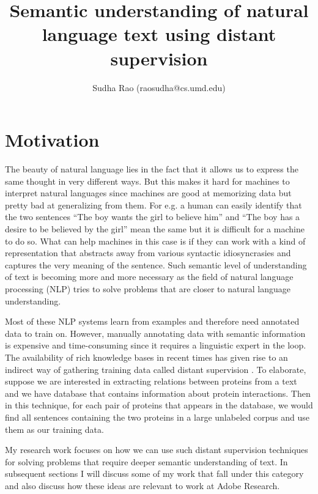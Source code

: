 \documentclass[11pt,a4paper]{article}
\title{Semantic understanding of natural language text using distant supervision}
\author{Sudha Rao (raosudha@cs.umd.edu)}
\begin{document}
\maketitle
\section{Motivation}
The beauty of natural language lies in the fact that it allows us to express the same thought in very different ways. But this makes it hard for machines to interpret natural languages since machines are good at memorizing data but pretty bad at generalizing from them. For e.g. a human can easily identify that the two sentences ``The boy wants the girl to believe him'' and ``The boy has a desire to be believed by the girl'' mean the same but it is difficult for a machine to do so. What can help machines in this case is if they can work with a kind of representation that abstracts away from various syntactic idiosyncrasies and captures the very meaning of the sentence. Such semantic level of understanding of text is becoming more and more necessary as the field of natural language processing (NLP) tries to solve problems that are closer to natural language understanding. 

Most of these NLP systems learn from examples and therefore need annotated data to train on. However, manually annotating data with semantic information is expensive and time-consuming since it requires a linguistic expert in the loop. The availability of rich knowledge bases in recent times has given rise to an indirect way of gathering training data called distant supervision \cite{mintz2009distant}. To elaborate, suppose we are interested in extracting relations between proteins from a text and we have database that contains information about protein interactions. Then in this technique, for each pair of proteins that appears in the database, we would find all sentences containing the two proteins in a large unlabeled corpus and use them as our training data. %

My research work focuses on how we can use such distant supervision techniques for solving problems that require deeper semantic understanding of text. In subsequent sections I will discuss some of my work that fall under this category and also discuss how these ideas are relevant to work at Adobe Research.
\end{document}
